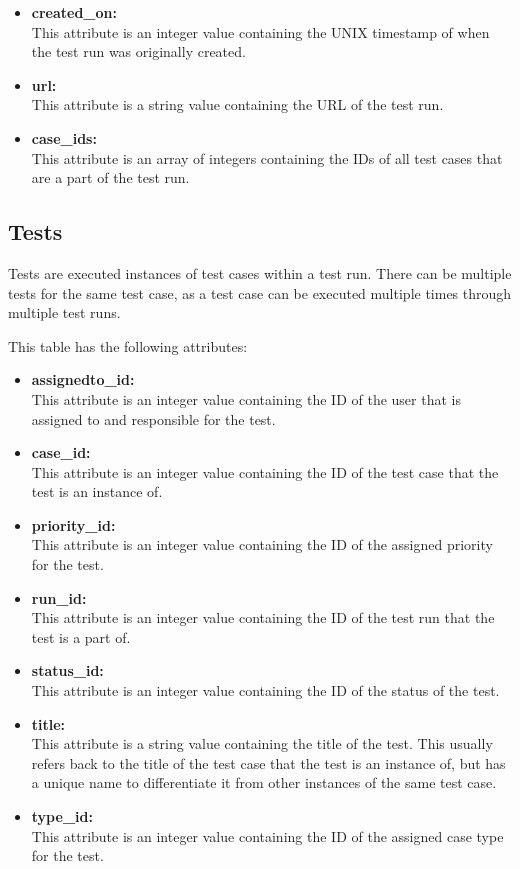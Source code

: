 \begin{itemize}
    \item \textbf{created_on:} \\
    This attribute is an integer value containing the UNIX timestamp of when the test run was originally created.

    \item \textbf{url:} \\
    This attribute is a string value containing the URL of the test run.

    \item \textbf{case_ids:} \\
    This attribute is an array of integers containing the IDs of all test cases that are a part of the test run.
\end{itemize}

\subsection{Tests}

Tests are executed instances of test cases within a test run. There can be multiple tests for the same test case, as a test case can be executed multiple times through multiple test runs.

This table has the following attributes:~\cite{TRTests}
\begin{itemize}
    \item \textbf{assignedto_id:} \\
    This attribute is an integer value containing the ID of the user that is assigned to and responsible for the test.

    \item \textbf{case_id:} \\
    This attribute is an integer value containing the ID of the test case that the test is an instance of.

    \item \textbf{priority_id:} \\
    This attribute is an integer value containing the ID of the assigned priority for the test.

    \item \textbf{run_id:} \\
    This attribute is an integer value containing the ID of the test run that the test is a part of.

    \item \textbf{status_id:} \\
    This attribute is an integer value containing the ID of the status of the test.

    \item \textbf{title:} \\
    This attribute is a string value containing the title of the test. This usually refers back to the title of the test case that the test is an instance of, but has a unique name to differentiate it from other instances of the same test case.

    \item \textbf{type_id:} \\
    This attribute is an integer value containing the ID of the assigned case type for the test.
\end{itemize}

